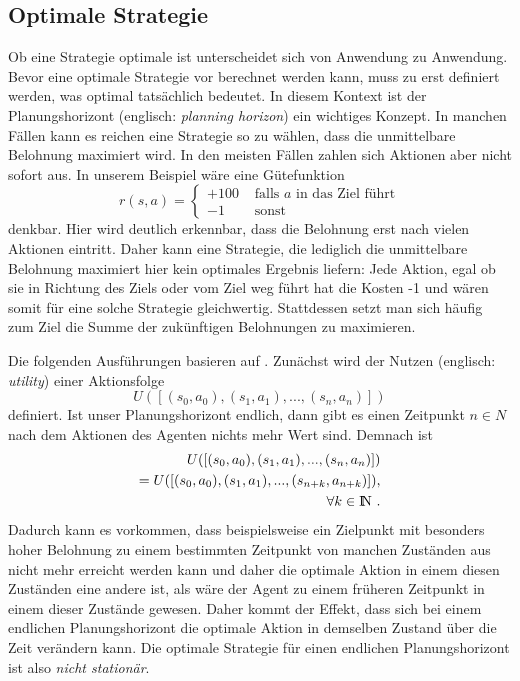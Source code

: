 \documentclass[a4paper]{IEEEtran}
\def\IN{\mathrm{I\hspace{-2pt}N}} %
\begin{document}
\subsection{Optimale Strategie}
Ob eine Strategie optimale ist unterscheidet sich von Anwendung zu Anwendung. Bevor eine optimale Strategie vor berechnet werden kann, muss zu erst definiert werden, was optimal tatsächlich bedeutet. In diesem Kontext ist der Planungshorizont (englisch: \emph{planning horizon}) ein wichtiges Konzept. In manchen Fällen kann es reichen eine Strategie so zu wählen, dass die unmittelbare Belohnung maximiert wird. In den meisten Fällen zahlen sich Aktionen aber nicht sofort aus. In unserem Beispiel wäre eine Gütefunktion
\begin{equation}
	r(s,a) = \left\{ \begin{array}{rl}
		+100 &\mbox{ falls $a$ in das Ziel führt} \\
		-1 &\mbox{ sonst}
       \end{array} \right.
\end{equation}
denkbar. Hier wird deutlich erkennbar, dass die Belohnung erst nach vielen Aktionen eintritt. Daher kann eine Strategie, die lediglich die unmittelbare Belohnung maximiert hier kein optimales Ergebnis liefern: Jede Aktion, egal ob sie in Richtung des Ziels oder vom Ziel weg führt hat die Kosten -1 und wären somit für eine solche Strategie gleichwertig.
Stattdessen setzt man sich häufig zum Ziel die Summe der zukünftigen Belohnungen zu maximieren.

Die folgenden Ausführungen basieren auf \cite{russell1995artificial}. Zunächst wird der Nutzen (englisch: \emph{utility}) einer Aktionsfolge 
\begin{equation}
	U([(s_0, a_0), (s_1, a_1), ..., (s_n, a_n)])
\end{equation}
definiert. Ist unser Planungshorizont endlich, dann gibt es einen Zeitpunkt $n \in N$ nach dem Aktionen des Agenten nichts mehr Wert sind. Demnach ist 
\begin{equation}
	\begin{split}
		U([ (s_0, a_0), (s_1, a_1), ..., (s_n, a_n)]) \\
		= U([ (s_0, a_0), (s_1, a_1), ..., (s_{n+k}, a_{n+k})]),\\
		\forall k \in \IN \ .
	\end{split}
\end{equation}
Dadurch kann es vorkommen, dass beispielsweise ein Zielpunkt mit besonders hoher Belohnung zu einem bestimmten Zeitpunkt von manchen Zuständen aus nicht mehr erreicht werden kann und daher die optimale Aktion in einem diesen Zuständen eine andere ist, als wäre der Agent zu einem früheren Zeitpunkt in einem dieser Zustände gewesen. Daher kommt der Effekt, dass sich bei einem endlichen Planungshorizont die optimale Aktion in demselben Zustand über die Zeit verändern kann. Die optimale Strategie für einen endlichen Planungshorizont ist also \emph{nicht stationär}.
\end{document}
